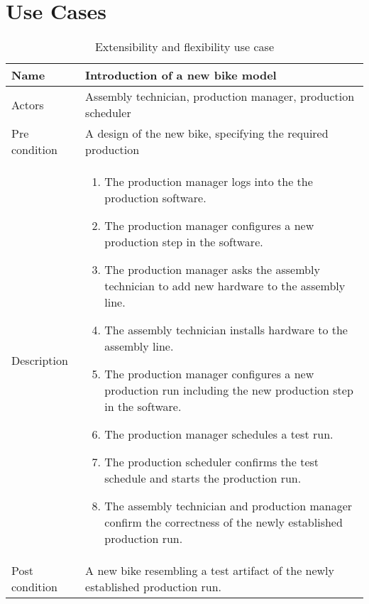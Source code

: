 \section{Use Cases}
\begin{table}[H]
\caption{Extensibility and flexibility use case}
\centering
\begin{tabular}{|l|p{8cm}|} \hline
Name & Introduction of a new bike model \\ \hline
Actors & Assembly technician, production manager, production scheduler \\ \hline
Pre condition & A design of the new bike, specifying the required production  \\ \hline
Description & \begin{enumerate} 
\item The production manager logs into the the production software.
\item The production manager configures a new production step in the software.
\item The production manager asks the assembly technician to add new hardware to the assembly line.
\item The assembly technician installs hardware to the assembly line.
\item The production manager configures a new production run including the new production step in the software.
\item The production manager schedules a test run.
\item The production scheduler confirms the test schedule and starts the production run.
\item The assembly technician and production manager confirm the correctness of the newly established production run.
\end{enumerate} \\ \hline
Post condition & A new bike resembling a test artifact of the newly established production run. \\
\hline
\end{tabular}
\end{table}

